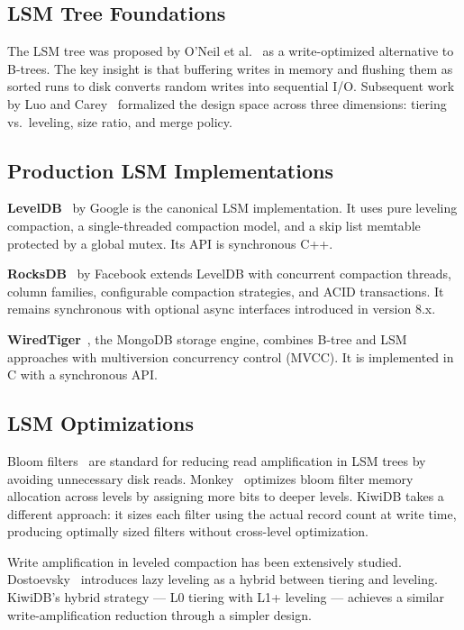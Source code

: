 \documentclass[conference]{IEEEtran}
\begin{document}
\subsection{LSM Tree Foundations}

The LSM tree was proposed by O'Neil et al.~\cite{oneil1996} as a write-optimized alternative to B-trees. The key insight is that buffering writes in memory and flushing them as sorted runs to disk converts random writes into sequential I/O. Subsequent work by Luo and Carey~\cite{luo2020} formalized the design space across three dimensions: tiering vs.\ leveling, size ratio, and merge policy.

\subsection{Production LSM Implementations}

\textbf{LevelDB}~\cite{leveldb} by Google is the canonical LSM implementation. It uses pure leveling compaction, a single-threaded compaction model, and a skip list memtable protected by a global mutex. Its API is synchronous C++.

\textbf{RocksDB}~\cite{rocksdb} by Facebook extends LevelDB with concurrent compaction threads, column families, configurable compaction strategies, and ACID transactions. It remains synchronous with optional async interfaces introduced in version 8.x.

\textbf{WiredTiger}~\cite{wiredtiger}, the MongoDB storage engine, combines B-tree and LSM approaches with multiversion concurrency control (MVCC). It is implemented in C with a synchronous API.

\subsection{LSM Optimizations}

Bloom filters~\cite{bloom1970} are standard for reducing read amplification in LSM trees by avoiding unnecessary disk reads. Monkey~\cite{dayan2017} optimizes bloom filter memory allocation across levels by assigning more bits to deeper levels. KiwiDB takes a different approach: it sizes each filter using the actual record count at write time, producing optimally sized filters without cross-level optimization.

Write amplification in leveled compaction has been extensively studied. Dostoevsky~\cite{dayan2018} introduces lazy leveling as a hybrid between tiering and leveling. KiwiDB's hybrid strategy --- L0 tiering with L1+ leveling --- achieves a similar write-amplification reduction through a simpler design.
\end{document}
